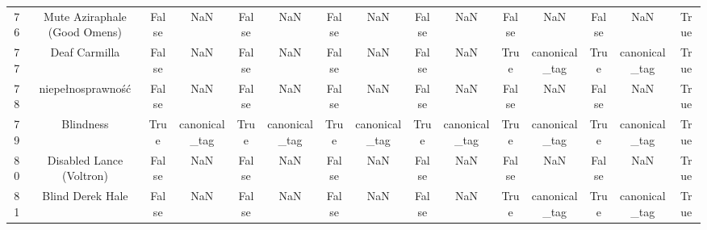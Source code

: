 \begin{table}[h!]
{\begin{tabular}{|c|c|c|c|c|c|c|c|c|c|c|c|c|c|c|}
         76 &                      Mute Aziraphale (Good Omens) &                          False &                       NaN &                          False &                       NaN &                          False &                       NaN &                          False &                       NaN &                          False &                       NaN &                          False &                       NaN &                           True \\
         77 &                                     Deaf Carmilla &                          False &                       NaN &                          False &                       NaN &                          False &                       NaN &                          False &                       NaN &                           True &             canonical\_tag &                           True &             canonical\_tag &                           True \\
         78 &                                 niepełnosprawność &                          False &                       NaN &                          False &                       NaN &                          False &                       NaN &                          False &                       NaN &                          False &                       NaN &                          False &                       NaN &                           True \\
         79 &                                         Blindness &                           True &             canonical\_tag &                           True &             canonical\_tag &                           True &             canonical\_tag &                           True &             canonical\_tag &                           True &             canonical\_tag &                           True &             canonical\_tag &                           True \\
         80 &                          Disabled Lance (Voltron) &                          False &                       NaN &                          False &                       NaN &                          False &                       NaN &                          False &                       NaN &                          False &                       NaN &                          False &                       NaN &                           True \\
         81 &                                  Blind Derek Hale &                          False &                       NaN &                          False &                       NaN &                          False &                       NaN &                          False &                       NaN &                           True &             canonical\_tag &                           True &             canonical\_tag &                           True \\

\end{tabular}}
\end{table}
